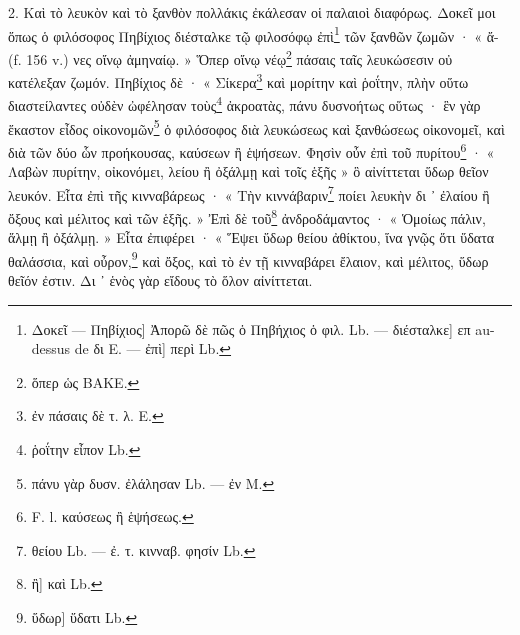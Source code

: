 \documentclass[a4paper, 11pt, oneside, polutonikogreek, french]{article}
\begin{document}
2. Καὶ τὸ λευκὸν καὶ τὸ ξανθὸν πολλάκις ἐκάλεσαν οἱ παλαιοὶ διαφόρως. Δοκεῖ μοι ὅπως ὁ φιλόσοφος Πηβίχιος διέσταλκε τῷ φιλοσόφῳ ἐπὶ\footnote{Δοκεῖ --- Πηβίχιος] Ἀπορῶ δὲ πῶς ὁ Πηβήχιος ὁ φιλ. Lb. --- διέσταλκε] επ au-dessus de δι E. --- ἐπὶ] περὶ Lb.} τῶν ξανθῶν ζωμῶν · « ἄ- (f. 156 v.) νες οἴνῳ ἀμηναίῳ. » Ὅπερ οἴνῳ νέῳ\footnote{ὅπερ ὡς BAKE.} πάσαις ταῖς λευκώσεσιν οὐ κατέλεξαν ζωμόν. Πηβίχιος δὲ · « Σίκερα\footnote{ἐν πάσαις δὲ τ. λ. E.} καὶ μορίτην καὶ ῥοΐτην, πλὴν οὕτω διαστείλαντες οὐδὲν ὠφέλησαν τοὺς\footnote{ῥοΐτην εἶπον Lb.} ἀκροατὰς, πάνυ δυσνοήτως οὕτως · ἓν γὰρ ἕκαστον εἶδος οἰκονομῶν\footnote{πάνυ γὰρ δυσν. ἐλάλησαν Lb. --- ἐν M.} ὁ φιλόσοφος διὰ λευκώσεως καὶ ξανθώσεως οἰκονομεῖ, καὶ διὰ τῶν δύο ὧν προήκουσας, καύσεων ἢ ἑψήσεων. Φησὶν οὖν ἐπὶ τοῦ πυρίτου\footnote{F. l. καύσεως ἢ ἑψήσεως.} · « Λαβὼν πυρίτην, οἰκονόμει, λείου ἢ ὀξάλμῃ καὶ τοῖς ἑξῆς » ὃ αἰνίττεται ὕδωρ θεῖον λευκόν. Εἶτα ἐπὶ τῆς κινναβάρεως · « Τὴν κιννάβαριν\footnote{θείου Lb. --- ἐ. τ. κινναβ. φησίν Lb.} ποίει λευκὴν δι ᾽ ἐλαίου ἢ ὄξους καὶ μέλιτος καὶ τῶν ἑξῆς. » Ἐπὶ δὲ τοῦ\footnote{ἢ] καὶ Lb.} ἀνδροδάμαντος · « Ὁμοίως πάλιν, ἅλμῃ ἢ ὀξάλμῃ. » Εἶτα ἐπιφέρει · « Ἕψει ὕδωρ θείου ἀθίκτου, ἵνα γνῷς ὅτι ὕδατα θαλάσσια, καὶ οὖρον,\footnote{ὕδωρ] ὕδατι Lb.} καὶ ὄξος, καὶ τὸ ἐν τῇ κινναβάρει ἔλαιον, καὶ μέλιτος, ὕδωρ θεῖόν ἐστιν. Δι ᾽ ἑνὸς γὰρ εἴδους τὸ ὅλον αἰνίττεται.
\end{document}
